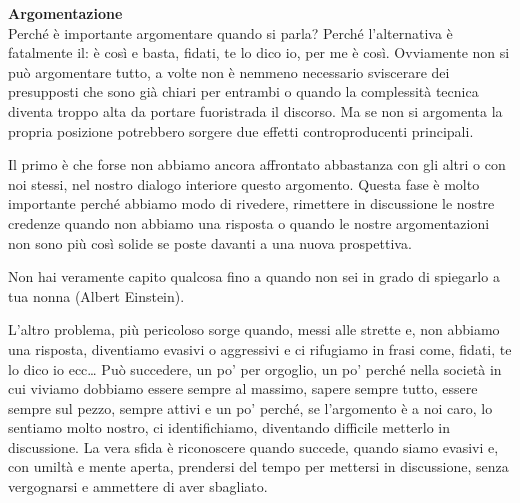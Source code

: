 \documentclass[12pt]{book} %
\begin{document}
\noindent \textbf{\large Argomentazione} \\
Perché è importante argomentare quando si parla? Perché l'alternativa è fatalmente il: è così e
basta, fidati, te lo dico io, per me è così. Ovviamente non si può argomentare tutto, a volte non è nemmeno necessario
sviscerare dei presupposti che sono già chiari per entrambi o quando la complessità tecnica diventa troppo alta da
portare fuoristrada il discorso. Ma se non si argomenta la propria posizione potrebbero sorgere due effetti
controproducenti principali.

Il primo è che forse non abbiamo ancora affrontato abbastanza con gli altri o con noi stessi, nel nostro dialogo
interiore questo argomento. Questa fase è molto importante perché abbiamo modo di rivedere, rimettere in discussione le
nostre credenze quando non abbiamo una risposta o quando le nostre argomentazioni non sono più così solide se poste
davanti a una nuova prospettiva. 

Non hai veramente capito qualcosa fino a quando non sei in grado di spiegarlo a tua nonna (Albert Einstein).

L'altro problema, più pericoloso sorge quando, messi alle strette e, non abbiamo una risposta,
diventiamo evasivi o aggressivi e ci rifugiamo in frasi come, fidati, te lo dico io ecc… Può succedere, un po' per orgoglio, un po'
perché nella società in cui viviamo dobbiamo essere sempre al massimo, sapere sempre tutto, essere sempre sul pezzo,
sempre attivi e un po' perché, se l'argomento è a noi caro, lo sentiamo molto nostro, ci
identifichiamo, diventando difficile metterlo in discussione. La vera sfida è riconoscere quando succede, quando siamo
evasivi e, con umiltà e mente aperta, prendersi del tempo per mettersi in discussione, senza vergognarsi e ammettere di
aver sbagliato. 
\end{document}
